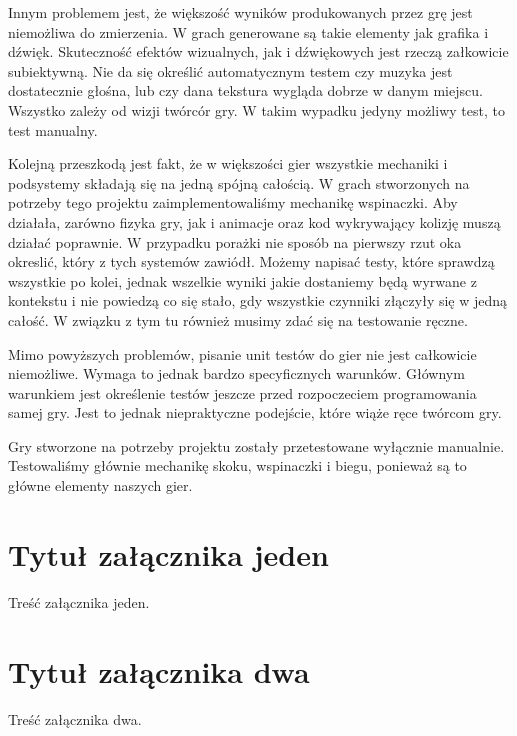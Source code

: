 \documentclass[brudnopis]{xmgr}
\begin{document}
Innym problemem jest, że większość wyników produkowanych przez grę jest niemożliwa do zmierzenia. 
W grach generowane są takie elementy jak grafika i dźwięk.  Skuteczność efektów wizualnych, jak i dźwiękowych jest rzeczą załkowicie subiektywną. Nie da się określić automatycznym testem czy muzyka jest dostatecznie głośna, lub czy dana tekstura wygląda dobrze w danym miejscu. Wszystko zależy od wizji twórcór gry. W takim wypadku jedyny możliwy test, to test manualny.

Kolejną przeszkodą jest fakt, że w większości gier wszystkie mechaniki i podsystemy składają się na jedną spójną całością. W grach stworzonych na potrzeby tego projektu zaimplementowaliśmy mechanikę wspinaczki. Aby działała, zarówno fizyka gry, jak i animacje oraz kod wykrywający kolizję muszą działać poprawnie. W przypadku porażki nie sposób na pierwszy rzut oka okreslić, który z tych systemów zawiódł. Możemy napisać testy, które sprawdzą wszystkie po kolei, jednak wszelkie wyniki jakie dostaniemy będą wyrwane z kontekstu i nie powiedzą co się stało, gdy wszystkie czynniki złączyły się w jedną całość. W związku z tym tu również musimy zdać się na testowanie ręczne.

Mimo powyższych problemów, pisanie unit testów do gier nie jest całkowicie niemożliwe. Wymaga to jednak bardzo specyficznych warunków. Głównym warunkiem jest określenie testów jeszcze przed rozpoczeciem programowania samej gry. Jest to jednak niepraktyczne podejście, które wiąże ręce twórcom gry.

Gry stworzone na potrzeby projektu zostały przetestowane wyłącznie manualnie. Testowaliśmy głównie mechanikę skoku, wspinaczki i biegu, ponieważ są to główne elementy naszych gier.


\summary

\appendix
\chapter{Tytuł załącznika jeden}

Treść załącznika jeden.

\chapter{Tytuł załącznika dwa}

Treść załącznika dwa.




\listoftables

\listoffigures

\oswiadczenie
\end{document}
